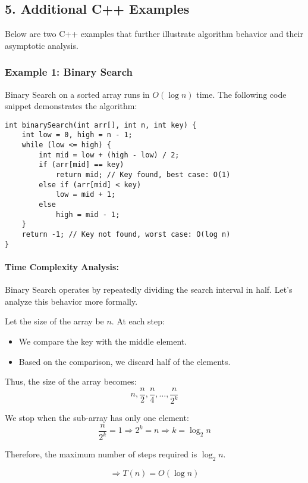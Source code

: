 \subsection*{\large \textbf{5. Additional C++ Examples}}

Below are two C++ examples that further illustrate algorithm behavior and their asymptotic analysis.

\subsubsection*{\textbf{Example 1: Binary Search}}

Binary Search on a sorted array runs in \( O(\log n) \) time. The following code snippet demonstrates the algorithm:

\begin{lstlisting}[caption={Binary Search in C++}]
int binarySearch(int arr[], int n, int key) {
    int low = 0, high = n - 1;
    while (low <= high) {
        int mid = low + (high - low) / 2;
        if (arr[mid] == key)
            return mid; // Key found, best case: O(1)
        else if (arr[mid] < key)
            low = mid + 1;
        else
            high = mid - 1;
    }
    return -1; // Key not found, worst case: O(log n)
}
\end{lstlisting}
\paragraph{Time Complexity Analysis:}

Binary Search operates by repeatedly dividing the search interval in half. Let's analyze this behavior more formally.

Let the size of the array be \( n \). At each step:

\begin{itemize}
  \item We compare the key with the middle element.
  \item Based on the comparison, we discard half of the elements.
\end{itemize}

Thus, the size of the array becomes:
\[
n, \frac{n}{2}, \frac{n}{4}, \dots, \frac{n}{2^k}
\]

We stop when the sub-array has only one element:
\[
\frac{n}{2^k} = 1 \Rightarrow 2^k = n \Rightarrow k = \log_2 n
\]

Therefore, the maximum number of steps required is \( \log_2 n \).

\[
\Rightarrow T(n) = O(\log n)
\]

